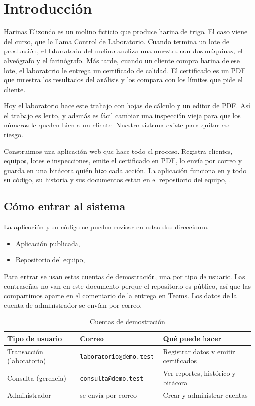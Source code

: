 \FloatBarrier
\section{Introducción}\label{sec:intro}

Harinas Elizondo es un molino ficticio que produce harina de trigo. El caso viene del curso, que lo llama Control de Laboratorio. Cuando termina un lote de producción, el laboratorio del molino analiza una muestra con dos máquinas, el alveógrafo y el farinógrafo. Más tarde, cuando un cliente compra harina de ese lote, el laboratorio le entrega un certificado de calidad. El certificado es un PDF que muestra los resultados del análisis y los compara con los límites que pide el cliente.

Hoy el laboratorio hace este trabajo con hojas de cálculo y un editor de PDF. Así el trabajo es lento, y además es fácil cambiar una inspección vieja para que los números le queden bien a un cliente. Nuestro sistema existe para quitar ese riesgo.

Construimos una aplicación web que hace todo el proceso. Registra clientes, equipos, lotes e inspecciones, emite el certificado en PDF, lo envía por correo y guarda en una bitácora quién hizo cada acción. La aplicación funciona en \urlprod{} y todo su código, su historia y sus documentos están en el repositorio del equipo, \urlrepo{}.

\subsection{Cómo entrar al sistema}\label{sec:acceso}

La aplicación y su código se pueden revisar en estas dos direcciones.

\begin{itemize}
  \item Aplicación publicada, \urlprod{}
  \item Repositorio del equipo, \urlrepo{}
\end{itemize}

Para entrar se usan estas cuentas de demostración, una por tipo de usuario. Las contraseñas no van en este documento porque el repositorio es público, así que las compartimos aparte en el comentario de la entrega en Teams. Los datos de la cuenta de administrador se envían por correo.

\begin{table}[H]
  \centering
  \caption{Cuentas de demostración}\label{tab:cuentas}
  \begin{tabularx}{\linewidth}{@{}llX@{}}
    \toprule
    Tipo de usuario & Correo & Qué puede hacer \\
    \midrule
    Transacción (laboratorio) & \tt{laboratorio@demo.test} & Registrar datos y emitir certificados \\
    Consulta (gerencia) & \tt{consulta@demo.test} & Ver reportes, histórico y bitácora \\
    Administrador & se envía por correo & Crear y administrar cuentas \\
    \bottomrule
  \end{tabularx}
\end{table}

